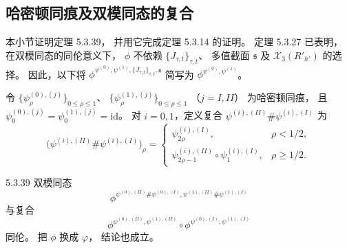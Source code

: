 
\subsection{哈密顿同痕及双模同态的复合}
\label{subsec:5-3-4}

本小节证明定理 5.3.39，
并用它完成定理 5.3.14 的证明。
定理 5.3.27 已表明，
在双模同态的同伦意义下，
$\phi$ 不依赖
$\{J_{\tau,t}\}_{\tau,t}$、
多值截面 $\mathfrak s$
及 $\mathcal X_3(R'_{h'})$
的选择。
因此，以下将
$\phi^{\psi^{(0)},\psi^{(1)},
\{J_{\tau,t}\}_{\tau,t},\mathfrak s}$
简写为
$\phi^{\psi^{(0)},\psi^{(1)}}$。

令
$\{\psi^{(0),(j)}_\rho\}_{0\le\rho\le1}$、
$\{\psi^{(1),(j)}_\rho\}_{0\le\rho\le1}$
（$j=I,II$）
为哈密顿同痕，
且
$\psi^{(0),(j)}_0
=\psi^{(1),(j)}_0=\mathrm{id}$。
对 $i=0,1$，定义复合
$\psi^{(i),(II)}\#\psi^{(i),(I)}$ 为
\[
\bigl(
\psi^{(i),(II)}
\#\psi^{(i),(I)}
\bigr)_\rho
=
\begin{cases}
\psi^{(i),(I)}_{2\rho},
&\rho<1/2,\\
\psi^{(i),(II)}_{2\rho-1}
\circ\psi^{(i),(I)}_1,
&\rho\ge1/2.
\end{cases}
\]

\begin{samepage}
\begin{theorem}{5.3.39}\label{thm:5-3-39}
双模同态
\[
\phi^{
\psi^{(0),(II)}\#\psi^{(0),(I)},
\psi^{(1),(II)}\#\psi^{(1),(I)}}
\]
与复合
\[
\phi^{\psi^{(0),(II)},\psi^{(1),(II)}}
\circ
\phi^{\psi^{(0),(I)},\psi^{(1),(I)}}
\]
同伦。
把 $\phi$ 换成 $\varphi$，
结论也成立。
\end{theorem}
\end{samepage}

